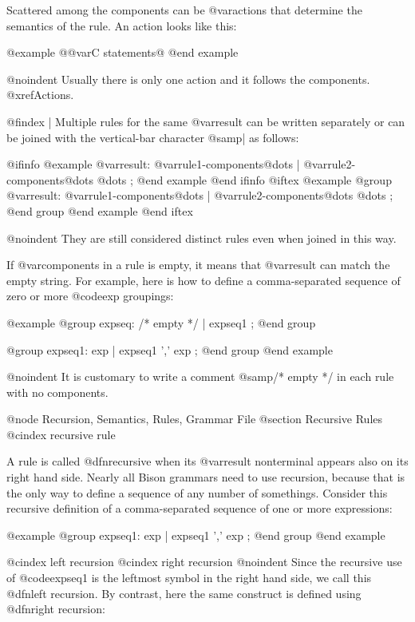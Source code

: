 {{{{{{{{{{{{{{{{{{Scattered among the components can be @var{actions} that determine
the semantics of the rule.  An action looks like this:

@example
@{@var{C statements}@}
@end example

@noindent
Usually there is only one action and it follows the components.
@xref{Actions}.

@findex |
Multiple rules for the same @var{result} can be written separately or can
be joined with the vertical-bar character @samp{|} as follows:

@ifinfo
@example
@var{result}:   @var{rule1-components}@dots{}
        | @var{rule2-components}@dots{}
        @dots{}
        ;
@end example
@end ifinfo
@iftex
@example
@group
@var{result}:    @var{rule1-components}@dots{}
        | @var{rule2-components}@dots{}
        @dots{}
        ;
@end group
@end example
@end iftex

@noindent
They are still considered distinct rules even when joined in this way.

If @var{components} in a rule is empty, it means that @var{result} can
match the empty string.  For example, here is how to define a
comma-separated sequence of zero or more @code{exp} groupings:

@example
@group
expseq:   /* empty */
        | expseq1
        ;
@end group

@group
expseq1:  exp
        | expseq1 ',' exp
        ;
@end group
@end example

@noindent
It is customary to write a comment @samp{/* empty */} in each rule
with no components.

@node Recursion, Semantics, Rules, Grammar File
@section Recursive Rules
@cindex recursive rule

A rule is called @dfn{recursive} when its @var{result} nonterminal appears
also on its right hand side.  Nearly all Bison grammars need to use
recursion, because that is the only way to define a sequence of any number
of somethings.  Consider this recursive definition of a comma-separated
sequence of one or more expressions:

@example
@group
expseq1:  exp
        | expseq1 ',' exp
        ;
@end group
@end example

@cindex left recursion
@cindex right recursion
@noindent
Since the recursive use of @code{expseq1} is the leftmost symbol in the
right hand side, we call this @dfn{left recursion}.  By contrast, here
the same construct is defined using @dfn{right recursion}:

}}}}}}}}}}}}}}}}}}
